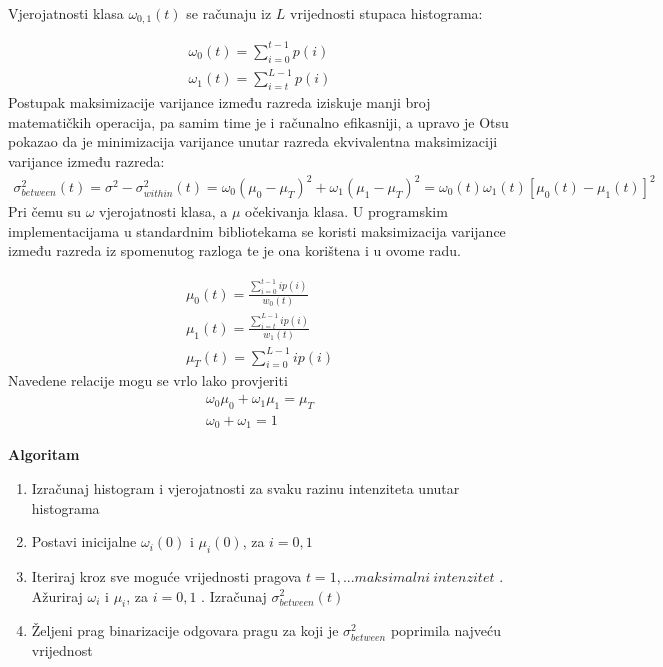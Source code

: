 \documentclass[times, utf8, diplomski]{fer}
\theoremstyle{definition}
\begin{document}
Vjerojatnosti klasa $\omega_{0,1}(t)$ se računaju iz $L$ vrijednosti stupaca histograma:

\begin{equation}
\begin{aligned}
\omega_0(t) = \sum_{i=0}^{t-1}p(i) \\
\omega_1(t) = \sum_{i=t}^{L-1}p(i)
\end{aligned}
\end{equation}
Postupak maksimizacije varijance između razreda iziskuje manji broj matematičkih operacija, pa samim time je i računalno efikasniji, a upravo je Otsu pokazao da je minimizacija varijance unutar razreda ekvivalentna maksimizaciji varijance između razreda:
\begin{equation}
\begin{aligned}
\sigma^2_{between}(t) = \sigma^2 - \sigma^2_{within}(t) = \omega_0(\mu_0 - \mu_T)^2 + \omega_1(\mu_1 - \mu_T)^2 = \omega_0(t)\omega_1(t)[\mu_0(t) - \mu_1(t)]^2
\end{aligned}
\end{equation}
Pri čemu su $\omega$ vjerojatnosti klasa, a $\mu$ očekivanja klasa.
U programskim implementacijama u standardnim bibliotekama se koristi maksimizacija varijance između razreda iz spomenutog razloga te je ona korištena i u ovome radu.


\begin{equation}
\begin{aligned}
\mu_0(t) = \frac{\sum_{i=0}^{t-1}ip(i)}{w_0(t)} \\
\mu_1(t) = \frac{\sum_{i=t}^{L-1}ip(i)}{w_1(t)} \\
\mu_T(t) = \sum_{i=0}^{L-1}ip(i)
\end{aligned}
\end{equation}
Navedene relacije mogu se vrlo lako provjeriti
\begin{equation}
\begin{aligned}
\omega_0\mu_0 + \omega_1\mu_1 = \mu_T \\
\omega_0 + \omega_1 = 1
\end{aligned}
\end{equation}

\textbf{Algoritam}

\begin{enumerate}
\item Izračunaj histogram i vjerojatnosti za svaku razinu intenziteta unutar histograma
\item Postavi inicijalne $\omega_i(0)$ i $\mu_i(0)$, za $i=0, 1$
\item Iteriraj kroz sve moguće vrijednosti pragova $t=1,...maksimalni\ intenzitet$
. Ažuriraj $\omega_i$ i $\mu_i$, za $i=0, 1$
. Izračunaj $\sigma^2_{between}(t)$
\item Željeni prag binarizacije odgovara pragu za koji je $\sigma^2_{between}$ poprimila najveću vrijednost
\end{enumerate}
\end{document}
